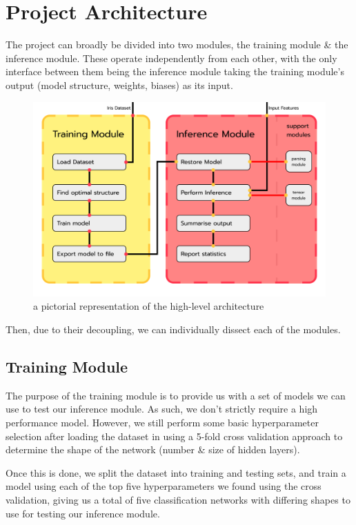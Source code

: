 \documentclass[12pt]{article}
\begin{document}
\section{Project Architecture}
The project can broadly be divided into two modules, the training module \& the inference module. These operate independently from each other, with the only interface between them being the inference module taking the training module's output (model structure, weights, biases) as its input.

\newpage
\begin{figure}
	\includegraphics[width=0.85\pdfpagewidth]{../images/modules.png}
	\caption{a pictorial representation of the high-level architecture}
\end{figure}

Then, due to their decoupling, we can individually dissect each of the modules.

\subsection{Training Module}
The purpose of the training module is to provide us with a set of models we can use to test our inference module. As such, we don't strictly require a high performance model. However, we still perform some basic hyperparameter selection after loading the dataset in using a 5-fold cross validation approach to determine the shape of the network (number \& size of hidden layers).\bigskip

Once this is done, we split the dataset into training and testing sets, and train a model using each of the top five hyperparameters we found using the cross validation, giving us a total of five classification networks with differing shapes to use for testing our inference module.\bigskip
\end{document}
